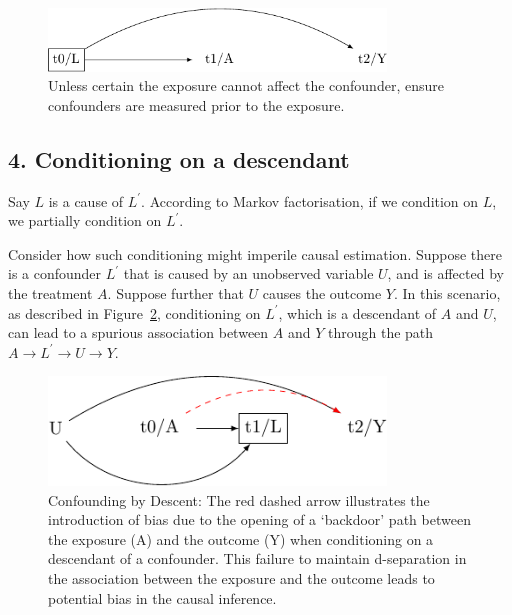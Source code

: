 \documentclass[
  singlecolumn]{report}
\begin{document}
\begin{figure}

{\centering \includegraphics[width=0.8\textwidth,height=\textheight]{causal-dags_files/figure-pdf/fig-dag-mediator-solution-1.pdf}

}

\caption{\label{fig-dag-mediator-solution}Unless certain the exposure
cannot affect the confounder, ensure confounders are measured prior to
the exposure.}

\end{figure}

\hypertarget{conditioning-on-a-descendant}{%
\subsection{4. Conditioning on a
descendant}\label{conditioning-on-a-descendant}}

Say \(L\) is a cause of \(L^\prime\). According to Markov factorisation,
if we condition on \(L\), we partially condition on \(L^\prime\).

Consider how such conditioning might imperile causal estimation. Suppose
there is a confounder \(L^\prime\) that is caused by an unobserved
variable \(U\), and is affected by the treatment \(A\). Suppose further
that \(U\) causes the outcome \(Y\). In this scenario, as described in
Figure~\ref{fig-dag-descendent}, conditioning on \(L^\prime\), which is
a descendant of \(A\) and \(U\), can lead to a spurious association
between \(A\) and \(Y\) through the path \(A \to L^\prime \to U \to Y\).

\begin{figure}

{\centering \includegraphics[width=0.8\textwidth,height=\textheight]{causal-dags_files/figure-pdf/fig-dag-descendent-1.pdf}

}

\caption{\label{fig-dag-descendent}Confounding by Descent: The red
dashed arrow illustrates the introduction of bias due to the opening of
a `backdoor' path between the exposure (A) and the outcome (Y) when
conditioning on a descendant of a confounder. This failure to maintain
d-separation in the association between the exposure and the outcome
leads to potential bias in the causal inference.}

\end{figure}
\end{document}
